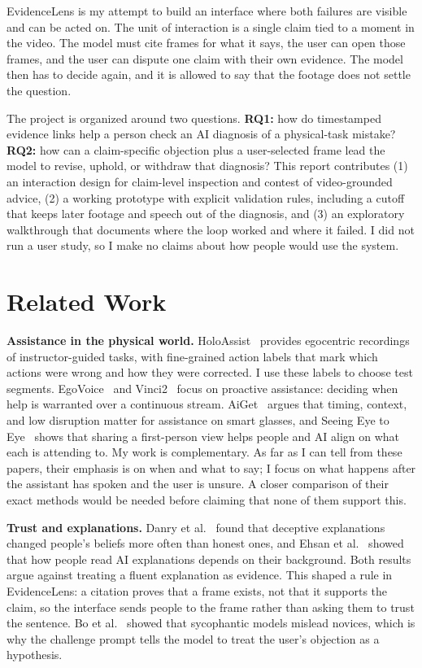 \documentclass[sigconf]{acmart}
\begin{document}
EvidenceLens is my attempt to build an interface where both failures are visible and can be acted on. The unit of interaction is a single claim tied to a moment in the video. The model must cite frames for what it says, the user can open those frames, and the user can dispute one claim with their own evidence. The model then has to decide again, and it is allowed to say that the footage does not settle the question.

The project is organized around two questions. \textbf{RQ1:} how do timestamped evidence links help a person check an AI diagnosis of a physical-task mistake? \textbf{RQ2:} how can a claim-specific objection plus a user-selected frame lead the model to revise, uphold, or withdraw that diagnosis? This report contributes (1) an interaction design for claim-level inspection and contest of video-grounded advice, (2) a working prototype with explicit validation rules, including a cutoff that keeps later footage and speech out of the diagnosis, and (3) an exploratory walkthrough that documents where the loop worked and where it failed. I did not run a user study, so I make no claims about how people would use the system.

\section{Related Work}

\textbf{Assistance in the physical world.} HoloAssist~\cite{wang2023holoassist} provides egocentric recordings of instructor-guided tasks, with fine-grained action labels that mark which actions were wrong and how they were corrected. I use these labels to choose test segments. EgoVoice~\cite{kim2026egovoice} and Vinci2~\cite{gong2026vinci2} focus on proactive assistance: deciding when help is warranted over a continuous stream. AiGet~\cite{cai2025aiget} argues that timing, context, and low disruption matter for assistance on smart glasses, and Seeing Eye to Eye~\cite{teng2026seeing} shows that sharing a first-person view helps people and AI align on what each is attending to. My work is complementary. As far as I can tell from these papers, their emphasis is on when and what to say; I focus on what happens after the assistant has spoken and the user is unsure. A closer comparison of their exact methods would be needed before claiming that none of them support this.

\textbf{Trust and explanations.} Danry et al.~\cite{danry2025deceptive} found that deceptive explanations changed people's beliefs more often than honest ones, and Ehsan et al.~\cite{ehsan2024who} showed that how people read AI explanations depends on their background. Both results argue against treating a fluent explanation as evidence. This shaped a rule in EvidenceLens: a citation proves that a frame exists, not that it supports the claim, so the interface sends people to the frame rather than asking them to trust the sentence. Bo et al.~\cite{bo2026saboteurs} showed that sycophantic models mislead novices, which is why the challenge prompt tells the model to treat the user's objection as a hypothesis.
\end{document}

